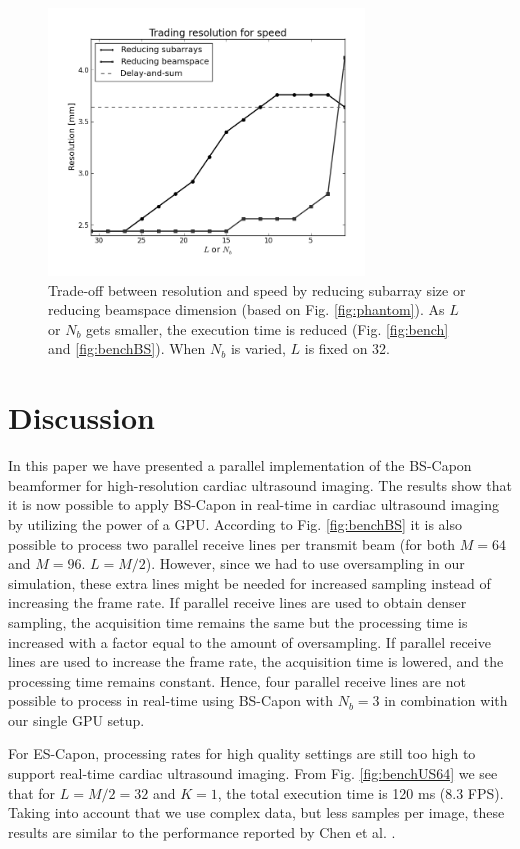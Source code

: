 \documentclass[journal]{IEEEtran}
\begin{document}
\begin{figure}
\centering
\includegraphics[width=3.3in]{gfx/speed_res_trade_d=0-01.png}
\caption{Trade-off between resolution and speed by reducing subarray size or reducing beamspace dimension (based on Fig. \ref{fig:phantom}). As $L$ or $N_b$ gets smaller, the execution time is reduced (Fig. \ref{fig:bench} and \ref{fig:benchBS}). When $N_b$ is varied, $L$ is fixed on 32.}
\label{fig:speed_res_trade}
\end{figure}

\section{Discussion}\label{sec:dis}
In this paper we have presented a parallel implementation of the BS-Capon beamformer for high-resolution cardiac ultrasound imaging. The results show that it is now possible to apply BS-Capon in real-time in cardiac ultrasound imaging by utilizing the power of a GPU. According to Fig. \ref{fig:benchBS} it is also possible to process two parallel receive lines per transmit beam (for both $M=64$ and $M=96$. $L=M/2$). However, since we had to use oversampling in our simulation, these extra lines might be needed for increased sampling instead of increasing the frame rate. If parallel receive lines are used to obtain denser sampling, the acquisition time remains the same but the processing time is increased with a factor equal to the amount of oversampling. If parallel receive lines are used to increase the frame rate, the acquisition time is lowered, and the processing time remains constant. Hence, four parallel receive lines are not possible to process in real-time using BS-Capon with $N_b=3$ in combination with our single GPU setup.

For ES-Capon, processing rates for high quality settings are still too high to support real-time cardiac ultrasound imaging. From Fig. \ref{fig:benchUS64} we see that for $L = M/2 = 32$ and $K=1$, the total execution time is 120 ms (8.3 FPS). Taking into account that we use complex data, but less samples per image, these results are similar to the performance reported by Chen et al. \cite{Chen2011}.
\end{document}
